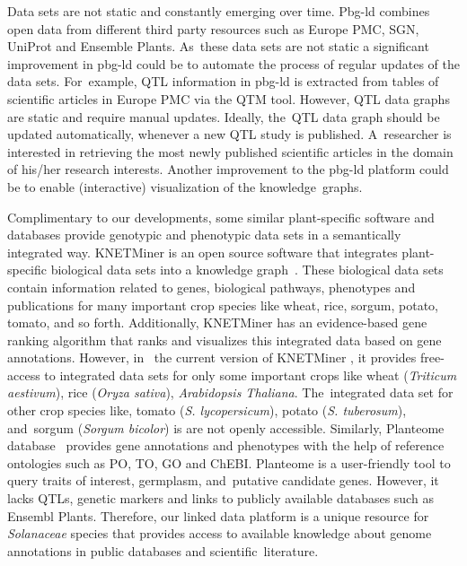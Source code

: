 \documentclass[applsci,article,accept,moreauthors,pdftex]{Definitions/mdpi}
\begin{document}
{Data sets are not static and constantly emerging over time. Pbg-ld combines open data from different third party resources such as Europe PMC, SGN, UniProt and Ensemble Plants. As~these data sets are not static a significant improvement in pbg-ld could be to automate the process of regular updates of the data sets. For~example, QTL information in pbg-ld is extracted from tables of scientific articles in Europe PMC via the QTM tool. However, QTL data graphs are static and require manual updates. Ideally, the~QTL data graph should be updated automatically, whenever a new QTL study is published. A~researcher is interested in retrieving the most newly published scientific articles in the domain of his/her research interests. Another improvement to the pbg-ld platform could be to enable (interactive) visualization of the knowledge~graphs.  

Complimentary to our developments, some similar plant-specific software and databases provide genotypic and phenotypic data sets in a semantically integrated way. KNETMiner is an open source software that integrates plant-specific biological data sets into a knowledge graph~\cite{hassani2017knowledge}. These biological data sets contain information related to genes, biological pathways, phenotypes and publications for many important crop species like wheat, rice, sorgum, potato, tomato, and so forth. Additionally, KNETMiner has an evidence-based gene ranking algorithm that ranks and visualizes this integrated data based on gene annotations. {However, in~ the current version of KNETMiner} \cite{Knetresources}{, it provides free-access to integrated data sets for only some important crops like wheat (\textit{Triticum aestivum}), rice (\textit{Oryza sativa}), \textit{Arabidopsis Thaliana}. The~integrated data set for other crop species like, tomato (\textit{S. lycopersicum}), potato (\textit{S. tuberosum}), and~sorgum (\textit{Sorgum bicolor}) is are not openly accessible. } Similarly, Planteome database~\cite{Cooper2018} provides gene annotations and phenotypes with the help of reference ontologies such as PO, TO, GO and ChEBI. Planteome is a user-friendly tool to query traits of interest, germplasm, and~putative candidate genes. However, it lacks QTLs, genetic markers and links to publicly available databases such as Ensembl Plants. Therefore, our linked data platform is a unique resource for \textit{Solanaceae} %
species that provides access to available knowledge about genome annotations in public databases and scientific~literature.

}
\end{document}
